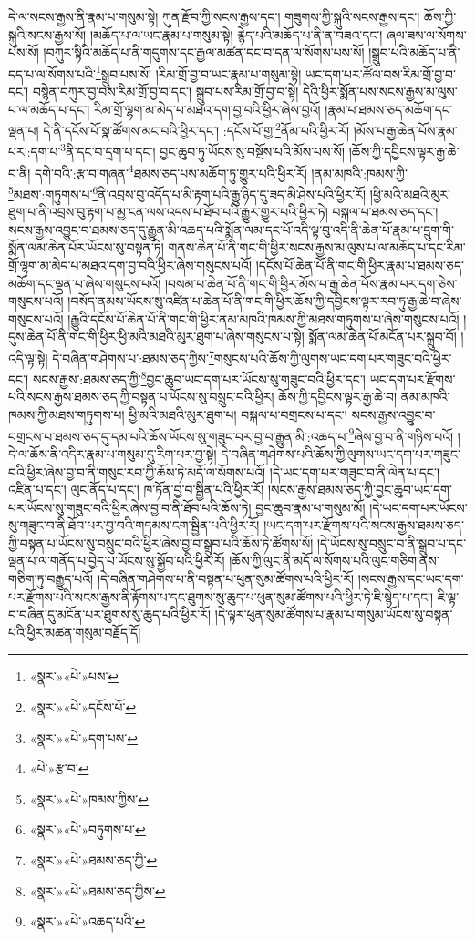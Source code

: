 དེ་ལ་སངས་རྒྱས་ནི་རྣམ་པ་གསུམ་སྟེ། ཀུན་རྫོབ་ཀྱི་སངས་རྒྱས་དང་། གཟུགས་ཀྱི་སྐུའི་སངས་རྒྱས་དང་། ཆོས་ཀྱི་སྐུའི་སངས་རྒྱས་སོ། །མཆོད་པ་ལ་ཡང་རྣམ་པ་གསུམ་སྟེ། རྙེད་པའི་མཆོད་པ་ནི་ན་བཟའ་དང་། ཞལ་ཟས་ལ་སོགས་པས་སོ། །བཀུར་སྟིའི་མཆོད་པ་ནི་གདུགས་དང་རྒྱལ་མཚན་དང་བ་དན་ལ་སོགས་པས་སོ། །སྒྲུབ་པའི་མཆོད་པ་ནི་དད་པ་ལ་སོགས་པའི་\footnote{«སྣར་»«པེ་»པས་}སྒྲུབ་པས་སོ། །རིམ་གྲོ་བྱ་བ་ཡང་རྣམ་པ་གསུམ་སྟེ། ཡང་དག་པར་ཚོལ་བས་རིམ་གྲོ་བྱ་བ་དང་། བསྙེན་བཀུར་བྱ་བས་རིམ་གྲོ་བྱ་བ་དང་། སྒྲུབ་པས་རིམ་གྲོ་བྱ་བ་སྟེ། དེའི་ཕྱིར་སྨོན་པས་སངས་རྒྱས་མ་ལུས་པ་ལ་མཆོད་པ་དང་། རིམ་གྲོ་ལྷག་མ་མེད་པ་མཐའ་དག་བྱ་བའི་ཕྱིར་ཞེས་བྱའོ། །རྣམ་པ་ཐམས་ཅད་མཆོག་དང་ལྡན་པ། དེ་ནི་དངོས་པོ་སྣ་ཚོགས་མང་བའི་ཕྱིར་དང་། :དངོས་པོ་གྱ་\footnote{«སྣར་»«པེ་»དངོས་པོ་}ནོམ་པའི་ཕྱིར་རོ། །མོས་པ་རྒྱ་ཆེན་པོས་རྣམ་པར་:དག་པ་\footnote{«སྣར་»«པེ་»དག་པས་}ནི་དང་བ་དྲག་པ་དང་། བྱང་ཆུབ་ཏུ་ཡོངས་སུ་བསྔོས་པའི་མོས་པས་སོ། །ཆོས་ཀྱི་དབྱིངས་ལྟར་རྒྱ་ཆེ་བ་ནི། དགེ་བའི་:རྩ་བ་གཞན་\footnote{«པེ་»རྩ་བ་}ཐམས་ཅད་པས་མཆོག་ཏུ་གྱུར་པའི་ཕྱིར་རོ། །ནམ་མཁའི་:ཁམས་ཀྱི་\footnote{«སྣར་»«པེ་»ཁམས་ཀྱིས་}མཐས་:གཏུགས་པ་\footnote{«སྣར་»«པེ་»བཏུགས་པ་}ནི་འབྲས་བུ་འདོད་པ་མི་རྟག་པའི་རྒྱུ་ཉིད་དུ་ཟད་མི་ཤེས་པའི་ཕྱིར་རོ། །ཕྱི་མའི་མཐའི་མུར་ཐུག་པ་ནི་འབྲས་བུ་རྟག་པ་མྱ་ངན་ལས་འདས་པ་ཐོབ་པའི་རྒྱུར་གྱུར་པའི་ཕྱིར་ཏེ། བསྐལ་པ་ཐམས་ཅད་དང་། སངས་རྒྱས་འབྱུང་བ་ཐམས་ཅད་དུ་རྒྱུན་མི་འཆད་པའི་སྨོན་ལམ་དང་པོ་འདི་ལྟ་བུ་འདི་ནི་ཆེན་པོ་རྣམ་པ་དྲུག་གི་སྨོན་ལམ་ཆེན་པོར་ཡོངས་སུ་བསྟན་ཏེ། གནས་ཆེན་པོ་ནི་གང་གི་ཕྱིར་སངས་རྒྱས་མ་ལུས་པ་ལ་མཆོད་པ་དང་རིམ་གྲོ་ལྷག་མ་མེད་པ་མཐའ་དག་བྱ་བའི་ཕྱིར་ཞེས་གསུངས་པའོ། །དངོས་པོ་ཆེན་པོ་ནི་གང་གི་ཕྱིར་རྣམ་པ་ཐམས་ཅད་མཆོག་དང་ལྡན་པ་ཞེས་གསུངས་པའོ། །བསམ་པ་ཆེན་པོ་ནི་གང་གི་ཕྱིར་མོས་པ་རྒྱ་ཆེན་པོས་རྣམ་པར་དག་ཅེས་གསུངས་པའོ། །བསོད་ནམས་ཡོངས་སུ་འཛིན་པ་ཆེན་པོ་ནི་གང་གི་ཕྱིར་ཆོས་ཀྱི་དབྱིངས་ལྟར་རབ་ཏུ་རྒྱ་ཆེ་བ་ཞེས་གསུངས་པའོ། །རྒྱུའི་དངོས་པོ་ཆེན་པོ་ནི་གང་གི་ཕྱིར་ནམ་མཁའི་ཁམས་ཀྱི་མཐས་གཏུགས་པ་ཞེས་གསུངས་པའོ། །དུས་ཆེན་པོ་ནི་གང་གི་ཕྱིར་ཕྱི་མའི་མཐའི་མུར་ཐུག་པ་ཞེས་གསུངས་པ་སྟེ། སྨོན་ལམ་ཆེན་པོ་མངོན་པར་སྒྲུབ་བོ། །འདི་ལྟ་སྟེ། དེ་བཞིན་གཤེགས་པ་:ཐམས་ཅད་ཀྱིས་\footnote{«སྣར་»«པེ་»ཐམས་ཅད་ཀྱི་}གསུངས་པའི་ཆོས་ཀྱི་ལུགས་ཡང་དག་པར་གཟུང་བའི་ཕྱིར་དང་། སངས་རྒྱས་:ཐམས་ཅད་ཀྱི་\footnote{«སྣར་»«པེ་»ཐམས་ཅད་ཀྱིས་}བྱང་ཆུབ་ཡང་དག་པར་ཡོངས་སུ་གཟུང་བའི་ཕྱིར་དང་། ཡང་དག་པར་རྫོགས་པའི་སངས་རྒྱས་ཐམས་ཅད་ཀྱི་བསྟན་པ་ཡོངས་སུ་བསྲུང་བའི་ཕྱིར། ཆོས་ཀྱི་དབྱིངས་ལྟར་རྒྱ་ཆེ་བ། ནམ་མཁའི་ཁམས་ཀྱི་མཐས་གཏུགས་པ། ཕྱི་མའི་མཐའི་མུར་ཐུག་པ། བསྐལ་པ་བགྲངས་པ་དང་། སངས་རྒྱས་འབྱུང་བ་བགྲངས་པ་ཐམས་ཅད་དུ་དམ་པའི་ཆོས་ཡོངས་སུ་གཟུང་བར་བྱ་བ་རྒྱུན་མི་:འཆད་པ་\footnote{«སྣར་»«པེ་»འཆད་པའི་}ཞེས་བྱ་བ་ནི་གཉིས་པའོ། །དེ་ལ་ཆོས་ནི་འདིར་རྣམ་པ་གསུམ་དུ་རིག་པར་བྱ་སྟེ། དེ་བཞིན་གཤེགས་པའི་ཆོས་ཀྱི་ལུགས་ཡང་དག་པར་གཟུང་བའི་ཕྱིར་ཞེས་བྱ་བ་ནི་གསུང་རབ་ཀྱི་ཆོས་ཏེ་མདོ་ལ་སོགས་པའོ། །དེ་ཡང་དག་པར་གཟུང་བ་ནི་ལེན་པ་དང་། འཛིན་པ་དང་། ལུང་ནོད་པ་དང་། ཁ་ཏོན་བྱ་བ་སྦྱིན་པའི་ཕྱིར་རོ། །སངས་རྒྱས་ཐམས་ཅད་ཀྱི་བྱང་ཆུབ་ཡང་དག་པར་ཡོངས་སུ་གཟུང་བའི་ཕྱིར་ཞེས་བྱ་བ་ནི་ཐོབ་པའི་ཆོས་ཏེ། བྱང་ཆུབ་རྣམ་པ་གསུམ་མོ། །དེ་ཡང་དག་པར་ཡོངས་སུ་གཟུང་བ་ནི་ཐོབ་པར་བྱ་བའི་གདམས་ངག་སྦྱིན་པའི་ཕྱིར་རོ། །ཡང་དག་པར་རྫོགས་པའི་སངས་རྒྱས་ཐམས་ཅད་ཀྱི་བསྟན་པ་ཡོངས་སུ་བསྲུང་བའི་ཕྱིར་ཞེས་བྱ་བ་སྒྲུབ་པའི་ཆོས་ཏེ་ཚོགས་སོ། །དེ་ཡོངས་སུ་བསྲུང་བ་ནི་སྒྲུབ་པ་དང་ལྡན་པ་ལ་གནོད་པ་བྱེད་པ་ཡོངས་སུ་སྐྱོབ་པའི་ཕྱིར་རོ། །ཆོས་ཀྱི་ལུང་ནི་མདོ་ལ་སོགས་པའི་ལུང་གཅིག་ནས་གཅིག་ཏུ་བརྒྱུད་པའོ། །དེ་བཞིན་གཤེགས་པ་ནི་བསྟན་པ་ཕུན་སུམ་ཚོགས་པའི་ཕྱིར་རོ། །སངས་རྒྱས་དང་ཡང་དག་པར་རྫོགས་པའི་སངས་རྒྱས་ནི་རྟོགས་པ་དང་ཐུགས་སུ་ཆུད་པ་ཕུན་སུམ་ཚོགས་པའི་ཕྱིར་ཏེ་ཇི་སྙེད་པ་དང་། ཇི་ལྟ་བ་བཞིན་དུ་མངོན་པར་ཐུགས་སུ་ཆུད་པའི་ཕྱིར་རོ། །དེ་ལྟར་ཕུན་སུམ་ཚོགས་པ་རྣམ་པ་གསུམ་ཡོངས་སུ་བསྟན་པའི་ཕྱིར་མཚན་གསུམ་བརྗོད་དོ། 